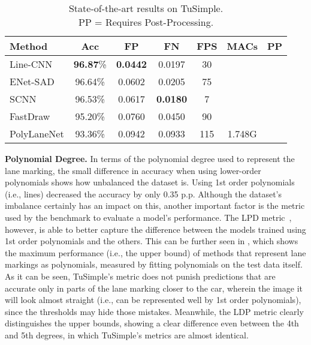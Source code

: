 \documentclass[a4paper,conference]{IEEEtran}
\begin{document}
\begin{table}[h]
	\centering
	\caption{State-of-the-art results on TuSimple.\protect\\ PP = Requires Post-Processing.}
	\label{tab:sota}
	\begin{tabular}{@{}lccc|cc|c@{}}
		\toprule
		\textbf{Method}                   & \textbf{Acc}      & \textbf{FP}       & \textbf{FN}        & \textbf{FPS} & \textbf{MACs} & \textbf{PP} \\ \midrule
		Line-CNN~\cite{linecnn2019tits}   & \textbf{96.87}\%  & \textbf{0.0442}   & 0.0197             & 30           &                &             \\
		ENet-SAD~\cite{enetsad2019iccv}   & 96.64\%           & 0.0602            & 0.0205             & 75           &                & \checkmark  \\
		SCNN~\cite{scnn2018aaai}          & 96.53\%           & 0.0617            & \textbf{0.0180}    & 7            &                & \checkmark  \\
		FastDraw~\cite{fastdraw2019cvpr}  & 95.20\%           & 0.0760            & 0.0450             & 90           &                & \checkmark  \\ \midrule
		PolyLaneNet                       & 93.36\%           & 0.0942            & 0.0933             & 115          & 1.748G          &             \\ \bottomrule
	\end{tabular}
\end{table} 
\textbf{Polynomial Degree.}
In terms of the polynomial degree used to represent the lane marking, the small difference in accuracy when using lower-order polynomials shows how unbalanced the dataset is. Using 1st order polynomials (i.e., lines) decreased the accuracy by only 0.35 p.p. Although the dataset's imbalance certainly has an impact on this, another important factor is the metric used by the benchmark to evaluate a model's performance. The LPD metric~\cite{satzoda2014icpr}, however, is able to better capture the difference between the models trained using 1st order polynomials and the others. This can be further seen in , which shows the maximum performance (i.e., the upper bound) of methods that represent lane markings as polynomials, measured by fitting polynomials on the test data itself. As it can be seen, TuSimple's metric does not punish predictions that are accurate only in parts of the lane marking closer to the car, wherein the image it will look almost straight (i.e., can be represented well by 1st order polynomials), since the thresholds may hide those mistakes. Meanwhile, the LDP metric clearly distinguishes the upper bounds, showing a clear difference even between the 4th and 5th degrees, in which  TuSimple's metrics are almost identical.
\end{document}
